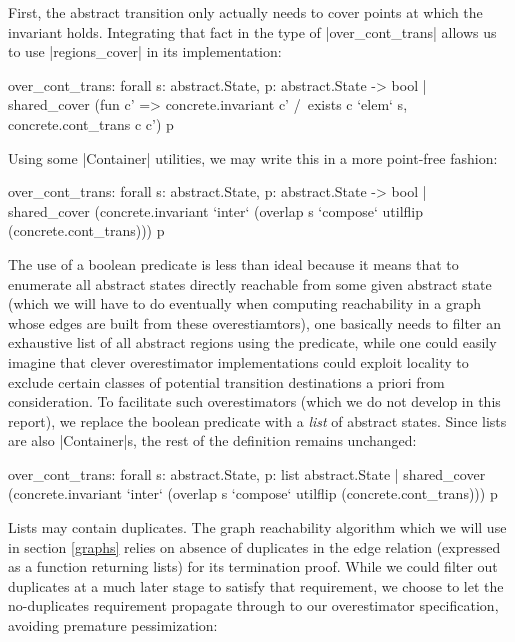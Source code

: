 \documentclass[runningheads]{llncs}
\begin{document}
{First, the abstract transition only actually needs to cover points at which the invariant holds. Integrating that fact in the type of |over_cont_trans| allows us to use |regions_cover| in its implementation:
\begin{code}
over_cont_trans: forall s: abstract.State,
  { p: abstract.State -> bool | shared_cover
    (fun c' => concrete.invariant c' /\ exists c `elem` s, concrete.cont_trans c c') p }
\end{code}
Using some |Container| utilities, we may write this in a more point-free fashion:
\begin{code}
over_cont_trans: forall s: abstract.State,
  { p: abstract.State -> bool | shared_cover
    (concrete.invariant `inter` (overlap s `compose` utilflip (concrete.cont_trans))) p }
\end{code}
The use of a boolean predicate is less than ideal because it means that to enumerate all abstract states directly reachable from some given abstract state (which we will have to do eventually when computing reachability in a graph whose edges are built from these overestiamtors), one basically needs to filter an exhaustive list of all abstract regions using the predicate, while one could easily imagine that clever overestimator implementations could exploit locality to exclude certain classes of potential transition destinations a priori from consideration. To facilitate such overestimators (which we do not develop in this report), we replace the boolean predicate with a \emph{list} of abstract states. Since lists are also |Container|s, the rest of the definition remains unchanged:
\begin{code}
over_cont_trans: forall s: abstract.State,
  { p: list abstract.State | shared_cover
    (concrete.invariant `inter` (overlap s `compose` utilflip (concrete.cont_trans))) p }
\end{code}

Lists may contain duplicates. The graph reachability algorithm which we will use in section \ref{graphs} relies on absence of duplicates in the edge relation (expressed as a function returning lists) for its termination proof. While we could filter out duplicates at a much later stage to satisfy that requirement, we choose to let the no-duplicates requirement propagate through to our overestimator specification, avoiding premature pessimization:
}
\end{document}
